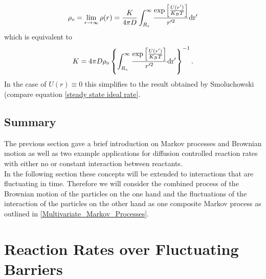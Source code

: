 \begin{equation}
    \rho_o = \lim_{r\rightarrow \infty} \rho(r) = \frac{K}{4 \pi D}\int_{R_s}^{\infty} \frac{\exp \left[ \frac{U(r')}{K_B T}\right]}{r'^2} \rm d r'
    \label{lim_rho_debye_infty}
\end{equation}
which is equivalent to 
\begin{equation}
    K = 4 \pi D \rho_o \left\{\int_{R_s}^{\infty} \frac{\exp \left[ \frac{U(r')}{K_B T}\right]}{r'^2} \rm d r' \right\}^{-1}.
    \label{K_Debye}
\end{equation}
In the case of $U(r) \equiv 0$ this simplifies to the result obtained by Smoluchowski (compare equation \eqref{steady state ideal rate}. \par
\subsection{Summary}
The previous section gave a brief introduction on Markov processes and Brownian motion as well as two example applications for diffusion controlled reaction rates with either no or constant interaction between reactants. \\
In the following section these concepts will be extended to interactions that are fluctuating in time. Therefore we will consider the combined process of the Brownian motion of the particles on the one hand and the fluctuations of the interaction of the particles on the other hand as one composite Markov process as outlined in \ref{Multivariate_Markov_Processes}.

\newpage
\section{Reaction Rates over Fluctuating Barriers}
\label{Reaction_Rates_over_Fluctuating_Barriers}

